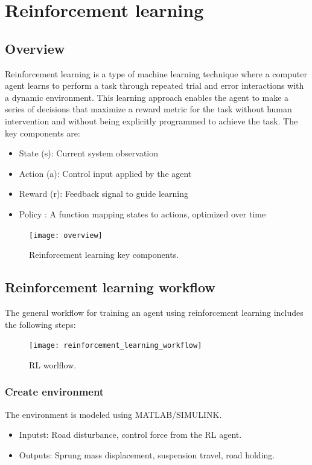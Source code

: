 \newpage
\section{Reinforcement learning}
\subsection{Overview}
Reinforcement learning is a type of machine learning technique where a computer agent learns to perform a task through repeated trial and error interactions with a dynamic environment. This learning approach enables the agent to make a series of decisions that maximize a reward metric for the task without human intervention and without being explicitly programmed to achieve the task.
The key components are:
\begin{itemize}
	\item State (s): Current system observation 
	\item Action (a): Control input applied by the agent 
	\item Reward (r): Feedback signal to guide learning 
	\item Policy : A function mapping states to actions, optimized over time
\end{itemize}

\begin{figure}[H]
	\centering
	\texttt{[image: overview]}
	\caption{Reinforcement learning key components. \cite{overview}
	}
\end{figure}

\subsection{Reinforcement learning workflow}
The general workflow for training an agent using reinforcement learning includes the following steps:
\begin{figure}[H]
	\centering
	\texttt{[image: reinforcement\_learning\_workflow]}
	\caption{RL worlflow. \cite{RL_workflow}
	}
\end{figure}

\newpage
\subsubsection{Create environment }
The environment is modeled using MATLAB/SIMULINK.
\begin{itemize}
	\item Inputst: Road disturbance, control force from the RL agent.
	\item Outputs: Sprung mass displacement, suspension travel, road holding. 
\end{itemize}

